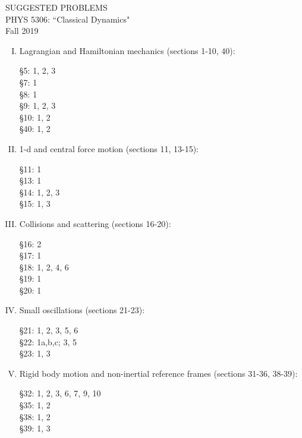 \documentclass[10pt]{article}
\numberwithin{equation}{section}
\def\ben{\begin{enumerate}}
\def\een{\end{enumerate}}
\def\i{\item{}}
\begin{document}
\begin{center}
SUGGESTED PROBLEMS\\
PHYS 5306: ``Classical Dynamics"\\
Fall 2019
\end{center}

\ben[I.]

\i Lagrangian and Hamiltonian mechanics (sections 1-10, 40):

\S 5: 1, 2, 3\\
\S 7: 1\\ 
\S 8: 1\\
\S 9: 1, 2, 3\\ 
\S 10: 1, 2\\
\S 40: 1, 2

\i 1-d and central force motion (sections 11, 13-15):

\S 11: 1\\
\S 13: 1\\
\S 14: 1, 2, 3\\ 
\S 15: 1, 3

\i Collisions and scattering (sections 16-20):

\S 16: 2\\
\S 17: 1\\
\S 18: 1, 2, 4, 6\\
\S 19: 1\\
\S 20: 1

\i Small oscillations (sections 21-23):

\S 21: 1, 2, 3, 5, 6\\
\S 22: 1a,b,c; 3, 5\\
\S 23: 1, 3

\i Rigid body motion and non-inertial reference frames (sections 31-36, 38-39):

\S 32: 1, 2, 3, 6, 7, 9, 10\\
\S 35: 1, 2\\
\S 38: 1, 2\\
\S 39: 1, 3

\een
\end{document}
